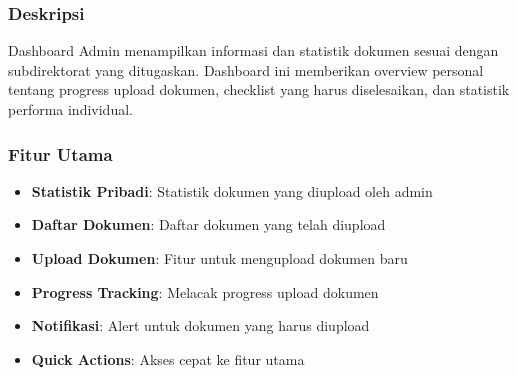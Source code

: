 \documentclass[12pt,a4paper]{article}
\begin{document}
\subsubsection{Deskripsi}
Dashboard Admin menampilkan informasi dan statistik dokumen sesuai dengan subdirektorat yang ditugaskan. Dashboard ini memberikan overview personal tentang progress upload dokumen, checklist yang harus diselesaikan, dan statistik performa individual.

\subsubsection{Fitur Utama}
\begin{itemize}
\item \textbf{Statistik Pribadi}: Statistik dokumen yang diupload oleh admin
\item \textbf{Daftar Dokumen}: Daftar dokumen yang telah diupload
\item \textbf{Upload Dokumen}: Fitur untuk mengupload dokumen baru
\item \textbf{Progress Tracking}: Melacak progress upload dokumen
\item \textbf{Notifikasi}: Alert untuk dokumen yang harus diupload
\item \textbf{Quick Actions}: Akses cepat ke fitur utama
\end{itemize}
\end{document}
